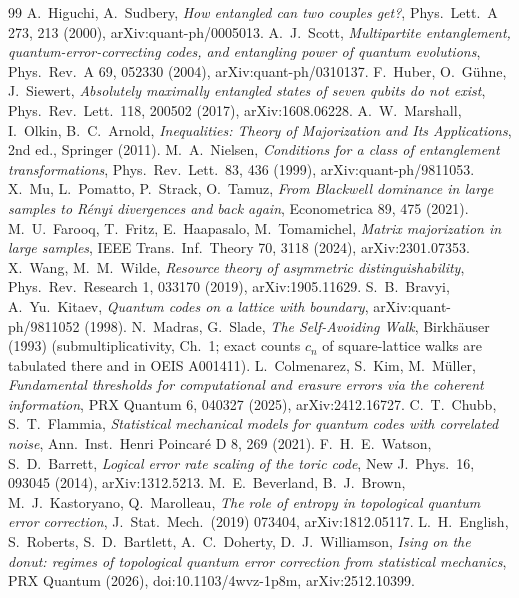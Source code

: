 \begin{thebibliography}{99}
 A.~Higuchi, A.~Sudbery, \emph{How entangled can two couples get?}, Phys.\ Lett.\ A 273, 213 (2000), arXiv:quant-ph/0005013. %
 A.~J.~Scott, \emph{Multipartite entanglement, quantum-error-correcting codes, and entangling power of quantum evolutions}, Phys.\ Rev.\ A 69, 052330 (2004), arXiv:quant-ph/0310137. %
 F.~Huber, O.~G\"uhne, J.~Siewert, \emph{Absolutely maximally entangled states of seven qubits do not exist}, Phys.\ Rev.\ Lett.\ 118, 200502 (2017), arXiv:1608.06228. %
 A.~W.~Marshall, I.~Olkin, B.~C.~Arnold, \emph{Inequalities: Theory of Majorization and Its Applications}, 2nd ed., Springer (2011). %
 M.~A.~Nielsen, \emph{Conditions for a class of entanglement transformations}, Phys.\ Rev.\ Lett.\ 83, 436 (1999), arXiv:quant-ph/9811053. %
 X.~Mu, L.~Pomatto, P.~Strack, O.~Tamuz, \emph{From Blackwell dominance in large samples to R\'enyi divergences and back again}, Econometrica 89, 475 (2021). %
 M.~U.~Farooq, T.~Fritz, E.~Haapasalo, M.~Tomamichel, \emph{Matrix majorization in large samples}, IEEE Trans.\ Inf.\ Theory 70, 3118 (2024), arXiv:2301.07353. %
 X.~Wang, M.~M.~Wilde, \emph{Resource theory of asymmetric distinguishability}, Phys.\ Rev.\ Research 1, 033170 (2019), arXiv:1905.11629. %
 S.~B.~Bravyi, A.~Yu.~Kitaev, \emph{Quantum codes on a lattice with boundary}, arXiv:quant-ph/9811052 (1998). %
 N.~Madras, G.~Slade, \emph{The Self-Avoiding Walk}, Birkh\"auser (1993) (submultiplicativity, Ch.~1; exact counts $c_n$ of square-lattice walks are tabulated there and in OEIS A001411). %
 L.~Colmenarez, S.~Kim, M.~M\"uller, \emph{Fundamental thresholds for computational and erasure errors via the coherent information}, PRX Quantum 6, 040327 (2025), arXiv:2412.16727. %
 C.~T.~Chubb, S.~T.~Flammia, \emph{Statistical mechanical models for quantum codes with correlated noise}, Ann.\ Inst.\ Henri Poincar\'e D 8, 269 (2021). %
 F.~H.~E.~Watson, S.~D.~Barrett, \emph{Logical error rate scaling of the toric code}, New J.\ Phys.\ 16, 093045 (2014), arXiv:1312.5213. %
 M.~E.~Beverland, B.~J.~Brown, M.~J.~Kastoryano, Q.~Marolleau, \emph{The role of entropy in topological quantum error correction}, J.\ Stat.\ Mech.\ (2019) 073404, arXiv:1812.05117. %
 L.~H.~English, S.~Roberts, S.~D.~Bartlett, A.~C.~Doherty, D.~J.~Williamson, \emph{Ising on the donut: regimes of topological quantum error correction from statistical mechanics}, PRX Quantum (2026), doi:10.1103/4wvz-1p8m, arXiv:2512.10399. %

\end{thebibliography}
